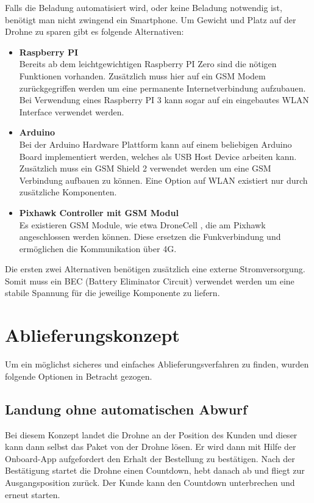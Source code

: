 Falls die Beladung automatisiert wird, oder keine Beladung notwendig ist, benötigt man nicht zwingend ein Smartphone. Um Gewicht und Platz auf der Drohne zu sparen gibt es folgende Alternativen:
\begin{itemize}
	\item{\textbf{Raspberry PI} \\
	Bereits ab dem leichtgewichtigen Raspberry PI Zero sind die nötigen Funktionen vorhanden. Zusätzlich muss hier auf ein GSM Modem zurückgegriffen werden um eine permanente Internetverbindung aufzubauen. Bei Verwendung eines Raspberry PI 3 kann sogar auf ein eingebautes WLAN Interface verwendet werden.
	}
	\item{\textbf{Arduino} \\
	Bei der Arduino Hardware Plattform kann auf einem beliebigen Arduino Board implementiert werden, welches als USB Host Device arbeiten kann. Zusätzlich muss ein GSM Shield 2 verwendet werden um eine GSM Verbindung aufbauen zu können. Eine Option auf WLAN existiert nur durch zusätzliche Komponenten.}

	\item{\textbf{Pixhawk Controller mit GSM Modul} \\
	Es existieren GSM Module, wie etwa DroneCell \cite{drone-cell}, die am Pixhawk angeschlossen werden können. Diese ersetzen die Funkverbindung und ermöglichen die Kommunikation über 4G.
	}

\end{itemize}

Die ersten zwei Alternativen benötigen zusätzlich eine externe Stromversorgung. Somit muss ein \Gls{BEC} (Battery Eliminator Circuit) verwendet werden um eine stabile Spannung für die jeweilige Komponente zu liefern. \\


\section{Ablieferungskonzept}
\label{chap:ablieferung}
Um ein möglichst sicheres und einfaches Ablieferungsverfahren zu finden, wurden folgende Optionen in Betracht gezogen.

\subsection{Landung ohne automatischen Abwurf}

Bei diesem Konzept landet die Drohne an der Position des Kunden und dieser kann dann selbst das Paket von der Drohne lösen. Er wird dann mit Hilfe der Onboard-App aufgefordert den Erhalt der Bestellung zu bestätigen. Nach der Bestätigung startet die Drohne einen Countdown, hebt danach ab und fliegt zur Ausgangsposition zurück. Der Kunde kann den Countdown unterbrechen und erneut starten.\\

